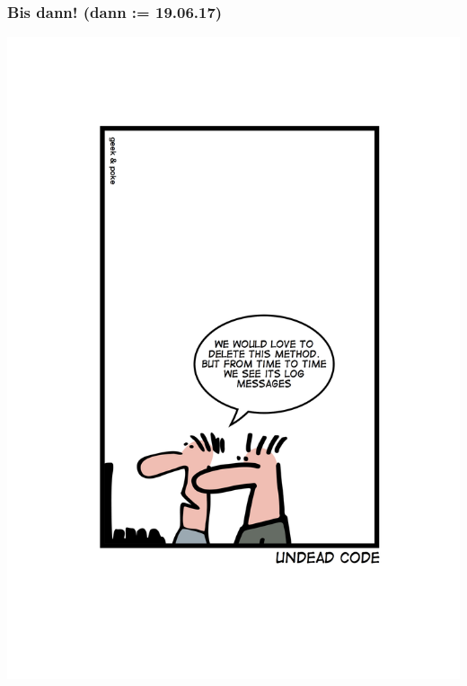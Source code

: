 \documentclass[18pt]{beamer}
\begin{document}
	\begin{frame}
		\frametitle{Bis dann! (dann  := 19.06.17)}
		\centering
		\includegraphics[scale=0.5]{./comics/geek_and_poke_undeadCode.jpg}
	\end{frame}
\end{document}
